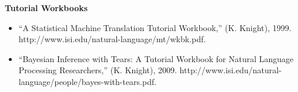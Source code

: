 \noindent
{\bf Tutorial Workbooks}

\begin{itemize}

\item ``A Statistical Machine Translation Tutorial 
Workbook,'' (K. Knight), 1999.  
http://www.isi.edu/natural-language/mt/wkbk.pdf.

\item ``Bayesian Inference with Tears: A Tutorial Workbook for
Natural Language Processing Researchers,'' (K. Knight), 2009.
http://www.isi.edu/natural-language/people/bayes-with-tears.pdf.

\end{itemize}



